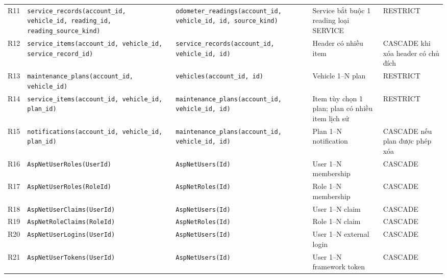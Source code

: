 \begin{smalltable}
\begin{longtable}{L{0.65cm}L{4.05cm}L{4.05cm}L{2.8cm}L{2.85cm}}
R11 & \texttt{service\_\allowbreak{}records(account\_\allowbreak{}id,\allowbreak{} vehicle\_\allowbreak{}id,\allowbreak{} reading\_\allowbreak{}id,\allowbreak{} reading\_\allowbreak{}source\_\allowbreak{}kind)} & \texttt{odometer\_\allowbreak{}readings(account\_\allowbreak{}id,\allowbreak{} vehicle\_\allowbreak{}id,\allowbreak{} id,\allowbreak{} source\_\allowbreak{}kind)} & Service bắt buộc 1 reading loại SERVICE & RESTRICT\\
R12 & \texttt{service\_\allowbreak{}items(account\_\allowbreak{}id,\allowbreak{} vehicle\_\allowbreak{}id,\allowbreak{} service\_\allowbreak{}record\_\allowbreak{}id)} & \texttt{service\_\allowbreak{}records(account\_\allowbreak{}id,\allowbreak{} vehicle\_\allowbreak{}id,\allowbreak{} id)} & Header có nhiều item & CASCADE khi xóa header có chủ đích\\
R13 & \texttt{maintenance\_\allowbreak{}plans(account\_\allowbreak{}id,\allowbreak{} vehicle\_\allowbreak{}id)} & \texttt{vehicles(account\_\allowbreak{}id,\allowbreak{} id)} & Vehicle 1–N plan & RESTRICT\\
R14 & \texttt{service\_\allowbreak{}items(account\_\allowbreak{}id,\allowbreak{} vehicle\_\allowbreak{}id,\allowbreak{} plan\_\allowbreak{}id)} & \texttt{maintenance\_\allowbreak{}plans(account\_\allowbreak{}id,\allowbreak{} vehicle\_\allowbreak{}id,\allowbreak{} id)} & Item tùy chọn 1 plan; plan có nhiều item lịch sử & RESTRICT\\
R15 & \texttt{notifications(account\_\allowbreak{}id,\allowbreak{} vehicle\_\allowbreak{}id,\allowbreak{} plan\_\allowbreak{}id)} & \texttt{maintenance\_\allowbreak{}plans(account\_\allowbreak{}id,\allowbreak{} vehicle\_\allowbreak{}id,\allowbreak{} id)} & Plan 1–N notification & CASCADE nếu plan được phép xóa\\
R16 & \texttt{AspNetUserRoles(UserId)} & \texttt{AspNetUsers(Id)} & User 1–N membership & CASCADE\\
R17 & \texttt{AspNetUserRoles(RoleId)} & \texttt{AspNetRoles(Id)} & Role 1–N membership & CASCADE\\
R18 & \texttt{AspNetUserClaims(UserId)} & \texttt{AspNetUsers(Id)} & User 1–N claim & CASCADE\\
R19 & \texttt{AspNetRoleClaims(RoleId)} & \texttt{AspNetRoles(Id)} & Role 1–N claim & CASCADE\\
R20 & \texttt{AspNetUserLogins(UserId)} & \texttt{AspNetUsers(Id)} & User 1–N external login & CASCADE\\
R21 & \texttt{AspNetUserTokens(UserId)} & \texttt{AspNetUsers(Id)} & User 1–N framework token & CASCADE\\
\bottomrule\end{longtable}\end{smalltable}
